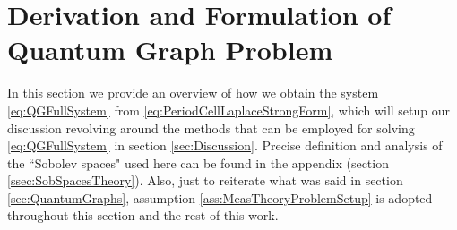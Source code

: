 \section{Derivation and Formulation of Quantum Graph Problem} \label{sec:SystemDerivation}

In this section we provide an overview of how we obtain the system \eqref{eq:QGFullSystem} from \eqref{eq:PeriodCellLaplaceStrongForm}, which will setup our discussion revolving around the methods that can be employed for solving \eqref{eq:QGFullSystem} in section \ref{sec:Discussion}.
Precise definition and analysis of the ``Sobolev spaces" used here can be found in the appendix (section \ref{ssec:SobSpacesTheory}). 
Also, just to reiterate what was said in section \ref{sec:QuantumGraphs}, assumption \ref{ass:MeasTheoryProblemSetup} is adopted throughout this section and the rest of this work. \newline

